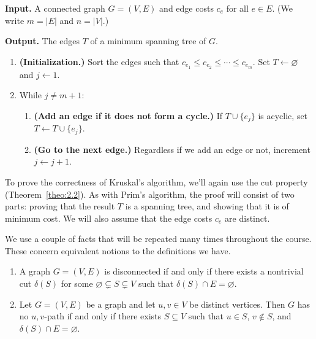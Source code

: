\begin{mdframed}[
    linewidth=1pt,
    linecolor=black,
    bottomline=false,topline=false,rightline=false,
    innerrightmargin=0pt,innertopmargin=0pt,innerbottommargin=0pt,
    innerleftmargin=1em,%
    skipabove=0.75\baselineskip
]
{\bf Input.} A connected graph $G = (V, E)$ and edge costs $c_e$ for 
all $e \in E$. (We write $m = |E|$ and $n = |V|$.)

{\bf Output.} The edges $T$ of a minimum spanning tree of $G$.
\begin{enumerate}[leftmargin=1.75cm, label={Step \arabic*.}]
    \item {\bf (Initialization.)} Sort the edges such that 
    $c_{e_1} \leq c_{e_2} \leq \cdots \leq c_{e_m}$. 
    Set $T \gets \varnothing$ and $j \gets 1$. 

    \item While $j \neq m+1$:
    \begin{enumerate}[label={}]
        \item {\bf (Add an edge if it does not form a cycle.)} 
        If $T \cup \{e_j\}$ is acyclic, set $T \gets T \cup \{e_j\}$. 
        \item {\bf (Go to the next edge.)} Regardless if we add an edge or not, 
        increment $j \gets j+1$. 
    \end{enumerate}
\end{enumerate}
\end{mdframed}\vspace{-0.15cm}

To prove the correctness of Kruskal's algorithm, we'll again use the cut 
property (Theorem~\ref{theo:2.2}). As with Prim's algorithm, the proof will 
consist of two parts: proving that the result $T$ is a spanning tree, and showing 
that it is of minimum cost. We will also assume that the edge costs $c_e$ are 
distinct. 

We use a couple of facts that will be repeated 
many times throughout the course. These concern equivalent 
notions to the definitions we have.
\begin{enumerate}[(1)]
    \item A graph $G = (V, E)$ is disconnected if and only if there exists a 
    nontrivial cut $\delta(S)$ for some $\varnothing \subsetneq S \subsetneq V$ such that 
    $\delta(S) \cap E = \varnothing$. 
    \item Let $G = (V, E)$ be a graph and let $u, v \in V$ be distinct vertices. 
    Then $G$ has no $u, v$-path if and only if there exists $S \subseteq V$ 
    such that $u \in S$, $v \notin S$, and $\delta(S) \cap E = \varnothing$. 
\end{enumerate}

